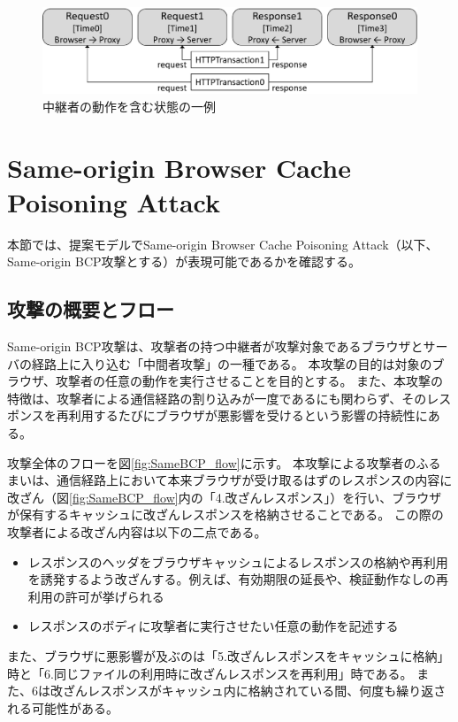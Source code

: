 \documentclass[12pt,a4paper]{jbook}
\begin{document}
\begin{figure}[htb]
\centering
\includegraphics[width=450pt]{./fig/TestIntermediary.eps}
\caption{中継者の動作を含む状態の一例}
\label{fig:TestIntermediary}
\end{figure}

\section{Same-origin Browser Cache Poisoning Attack}
\label{sec:same-origin-bcp}
本節では、提案モデルでSame-origin Browser Cache Poisoning Attack\cite{bcpattack}（以下、Same-origin BCP攻撃とする）が表現可能であるかを確認する。

\subsection{攻撃の概要とフロー}
Same-origin BCP攻撃は、攻撃者の持つ中継者が攻撃対象であるブラウザとサーバの経路上に入り込む「中間者攻撃」の一種である。
本攻撃の目的は対象のブラウザ、攻撃者の任意の動作を実行させることを目的とする。
また、本攻撃の特徴は、攻撃者による通信経路の割り込みが一度であるにも関わらず、そのレスポンスを再利用するたびにブラウザが悪影響を受けるという影響の持続性にある。

攻撃全体のフローを図\ref{fig:SameBCP_flow}に示す。
本攻撃による攻撃者のふるまいは、通信経路上において本来ブラウザが受け取るはずのレスポンスの内容に改ざん（図\ref{fig:SameBCP_flow}内の「4.改ざんレスポンス」）を行い、ブラウザが保有するキャッシュに改ざんレスポンスを格納させることである。
この際の攻撃者による改ざん内容は以下の二点である。
\begin{itemize}
\item レスポンスのヘッダをブラウザキャッシュによるレスポンスの格納や再利用を誘発するよう改ざんする。例えば、有効期限の延長や、検証動作なしの再利用の許可が挙げられる
\item レスポンスのボディに攻撃者に実行させたい任意の動作を記述する
\end{itemize}
また、ブラウザに悪影響が及ぶのは「5.改ざんレスポンスをキャッシュに格納」時と「6.同じファイルの利用時に改ざんレスポンスを再利用」時である。
また、6は改ざんレスポンスがキャッシュ内に格納されている間、何度も繰り返される可能性がある。
\end{document}
